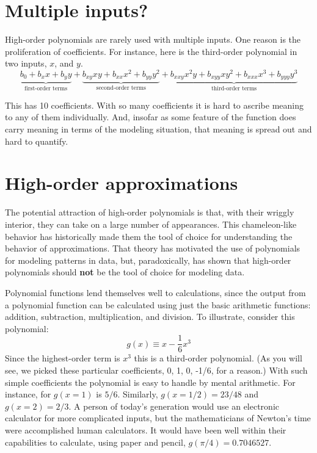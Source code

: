 \documentclass[
  letterpaper,
  DIV=11,
  numbers=noendperiod,
  oneside]{scrreprt}
\begin{document}
\hypertarget{multiple-inputs}{%
\section{Multiple inputs?}\label{multiple-inputs}}

High-order polynomials are rarely used with multiple inputs. One reason
is the proliferation of coefficients. For instance, here is the
third-order polynomial in two inputs, \(x\), and \(y\).
\[\underbrace{b_0 + b_x x + b_y y}_\text{first-order terms} + \underbrace{b_{xy} x y + b_{xx} x^2 + b_{yy} y^2}_\text{second-order terms} + \underbrace{b_{xxy} x^2 y + b_{xyy} x y^2 + b_{xxx} x^3 + b_{yyy} y^3}_\text{third-order terms}\]

This has 10 coefficients. With so many coefficients it is hard to
ascribe meaning to any of them individually. And, insofar as some
feature of the function does carry meaning in terms of the modeling
situation, that meaning is spread out and hard to quantify.

\hypertarget{sec-high-order-approx}{%
\section{High-order approximations}\label{sec-high-order-approx}}

The potential attraction of high-order polynomials is that, with their
wriggly interior, they can take on a large number of appearances. This
chameleon-like behavior has historically made them the tool of choice
for understanding the behavior of approximations. That theory has
motivated the use of polynomials for modeling patterns in data, but,
paradoxically, has shown that high-order polynomials should \textbf{not}
be the tool of choice for modeling data.

Polynomial functions lend themselves well to calculations, since the
output from a polynomial function can be calculated using just the basic
arithmetic functions: addition, subtraction, multiplication, and
division. To illustrate, consider this polynomial:
\[g(x) \equiv x - \frac{1}{6} x^3\] Since the highest-order term is
\(x^3\) this is a third-order polynomial. (As you will see, we picked
these particular coefficients, 0, 1, 0, -1/6, for a reason.) With such
simple coefficients the polynomial is easy to handle by mental
arithmetic. For instance, for \(g(x=1)\) is \(5/6\). Similarly,
\(g(x=1/2) = 23/48\) and \(g(x=2) = 2/3\). A person of today's
generation would use an electronic calculator for more complicated
inputs, but the mathematicians of Newton's time were accomplished human
calculators. It would have been well within their capabilities to
calculate, using paper and pencil, \(g(\pi/4) = 0.7046527\).
\end{document}
